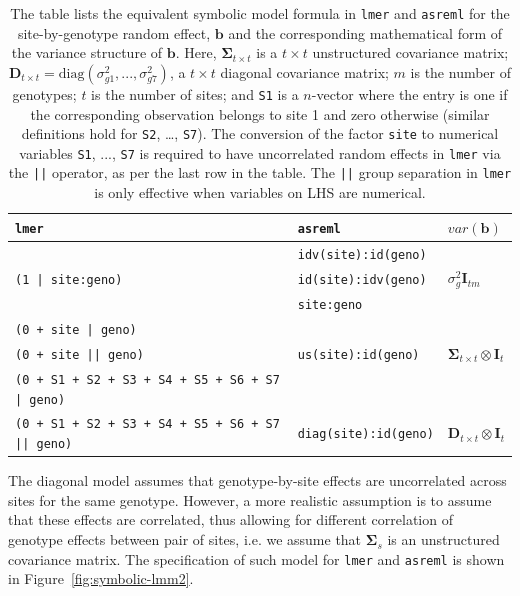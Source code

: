 \documentclass[runningheads]{llncs}\usepackage[]{graphicx}\usepackage[]{color}
\begin{document}
\begin{table}[]
	\centering
	
	\caption{The table lists the equivalent symbolic model formula in \texttt{lmer} and \texttt{asreml} for the site-by-genotype random effect, $\boldsymbol{b}$ and the corresponding mathematical form of the variance structure of $\boldsymbol{b}$. Here, $\mathbf{\Sigma}_{t\times t}$ is a $t\times t$ unstructured covariance matrix; $\mathbf{D}_{t\times t} = \text{diag}(\sigma^2_{g1}, ..., \sigma^2_{g7})$, a $t\times t$ diagonal covariance matrix; $m$ is the number of genotypes; $t$ is the number of sites; and \texttt{S1} is a $n$-vector where the entry is one if the corresponding observation belongs to site 1 and zero otherwise (similar definitions hold for \texttt{S2}, \ldots, \texttt{S7}). The conversion of the factor \texttt{site} to numerical variables \texttt{S1}, ..., \texttt{S7} is required to have uncorrelated random effects in \texttt{lmer} via the \texttt{||} operator, as per the last row in the table. The \texttt{||} group separation in \texttt{lmer} is only effective when variables on LHS are numerical.}
	\label{tab:gxe}
	\begin{tabular}{l@{\hskip 0.5cm}ll}
		\toprule
		\texttt{lmer} & \texttt{asreml} & $var(\boldsymbol{b})$  \\\toprule
		& \texttt{idv(site):id(geno)}&  \\
		\texttt{(1 | site:geno)} & \texttt{id(site):idv(geno)}&$\sigma^2_g\mathbf{I}_{tm}$  \\
		& \texttt{site:geno}& \\ \midrule
		\texttt{(0 + site | geno)}&  &   \\
		\texttt{(0 + site || geno)} & \texttt{us(site):id(geno)}& $\mathbf{\Sigma}_{t\times t}\otimes \mathbf{I}_{t}$ \\
		\texttt{(0 + S1 + S2 + S3 + S4 + S5 + S6 + S7 | geno)} & & \\
		\midrule
		\texttt{(0 + S1 + S2 + S3 + S4 + S5 + S6 + S7 || geno)} &\texttt{diag(site):id(geno)} & $\mathbf{D}_{t\times t}\otimes \mathbf{I}_{t}$ \\
		\bottomrule
	\end{tabular}
\end{table}

The diagonal model assumes that genotype-by-site effects are uncorrelated across sites for the same genotype. However, a more realistic assumption is to assume that these effects are correlated, thus allowing for different correlation of genotype effects between pair of sites, i.e. we assume that $\mathbf{\Sigma}_s$ is an unstructured covariance matrix. The specification of such model for \texttt{lmer} and \texttt{asreml} is shown in Figure~\ref{fig:symbolic-lmm2}.
\end{document}
